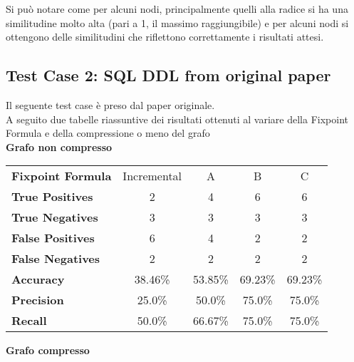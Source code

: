 \documentclass{article}
\begin{document}
\newpage

Si può notare come per alcuni nodi, principalmente quelli alla radice si ha una similitudine molto alta (pari a 1, il massimo raggiungibile) e per alcuni nodi si ottengono delle similitudini che riflettono correttamente i risultati attesi.\\

\subsection{Test Case 2: SQL DDL from original paper}


Il seguente test case è preso dal paper originale.\\

A seguito due tabelle riassuntive dei risultati ottenuti al variare della Fixpoint Formula e della compressione o meno del grafo\\

\textbf{Grafo non compresso}

\begin{center}
\begin{tabular}{| l | c | c | c | c |}
	\hline
	\textbf{Fixpoint Formula} & Incremental & A & B & C\\
	\hhline{|=|=|=|=|=|}
	\textbf{True Positives} & 2 & 4 & 6 & 6\\
	\hline
	\textbf{True Negatives} & 3 & 3 & 3 & 3\\
	\hline
	\textbf{False Positives} & 6 & 4 & 2 & 2\\
	\hline
	\textbf{False Negatives} & 2 & 2 & 2 & 2\\
	\hline
	\textbf{Accuracy} & 38.46\% & 53.85\% & 69.23\% & 69.23\%\\
	\hline
	\textbf{Precision} & 25.0\% & 50.0\% & 75.0\% & 75.0\%\\
	\hline
	\textbf{Recall} & 50.0\% & 66.67\% & 75.0\% & 75.0\%\\
	\hline
\end{tabular}
\end{center}
\vspace{4mm}

\textbf{Grafo compresso}
\end{document}

